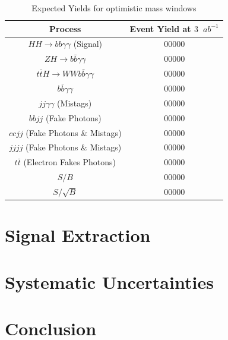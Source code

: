 \documentclass{cmspaper}
\begin{document}
\begin{table}[!ht]
\begin{center} 
\begin{tabular}{|c|c|}
\hline 
Process                                              &  Event Yield at $3$~$ab^{-1}$ \\  \hline
$HH \rightarrow bb\gamma\gamma$ (Signal)             &  00000                     \\  \hline
$ZH \rightarrow b\bar{b}\gamma\gamma$                &  00000                     \\  
$t\bar{t}H \rightarrow W W b \bar{b}\gamma\gamma$    &  00000                     \\  \hline
$b \bar{b} \gamma\gamma$                             &  00000                     \\  
$jj \gamma\gamma$ (Mistags)                          &  00000                     \\  
$bb jj$ (Fake Photons)                               &  00000                     \\  
$cc jj$ (Fake Photons \& Mistags)                    &  00000                     \\  
$jjjj$  (Fake Photons \& Mistags)                    &  00000                     \\  \hline
$t\bar{t}$ (Electron Fakes Photons)                  &  00000                     \\  \hline
\hline
$S/B$                                                &  00000                     \\  \hline
$S/\sqrt{B}$                                         &  00000                     \\  \hline

\end{tabular}
\caption{Expected Yields for optimistic mass windows }
\label{tab:EventYieldSummaryOptimisticMassWindows}
\end{center}
\end{table}
 




\section{Signal Extraction}
\label{sec:signalextraction}

\section{Systematic Uncertainties}
\label{sec:systematics}

\section{Conclusion}
\label{sec:conclusion}


%

\appendix
\appendixpage
\end{document}
